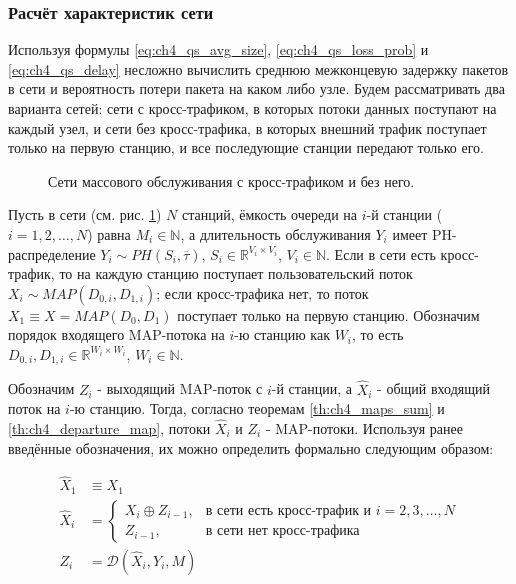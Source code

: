 \subsubsection{Расчёт характеристик сети}\label{sec:ch4_iterative_procedure}

Используя формулы \eqref{eq:ch4_qs_avg_size}, \eqref{eq:ch4_qs_loss_prob} и \eqref{eq:ch4_qs_delay} несложно вычислить среднюю межконцевую задержку пакетов в сети и вероятность потери пакета на каком либо узле. Будем рассматривать два варианта сетей: сети с кросс-трафиком, в которых потоки данных поступают на каждый узел, и сети без кросс-трафика, в которых внешний трафик поступает только на первую станцию, и все последующие станции передают только его.

\begin{figure}[htb]
  \caption{Сети массового обслуживания с кросс-трафиком и без него.}
  \label{fig:ch4_queueing_networks}
\end{figure}

Пусть в сети (см. рис. \ref{fig:ch4_queueing_networks}) $N$ станций, ёмкость очереди на $i$-й станции ($i = 1,2, \dots, N$) равна $M_i \in \mathbb{N}$, а длительность обслуживания $Y_i$ имеет PH-распределение $Y_i \sim PH(S_i, \overline{\tau})$, $S_i \in \mathbb{R}^{V_i \times V_i}$, $V_i \in \mathbb{N}$. Если в сети есть кросс-трафик, то на каждую станцию поступает пользовательский поток $X_i \sim MAP(D_{0,i}, D_{1,i})$; если кросс-трафика нет, то поток $X_1 \equiv X = MAP(D_0, D_1)$ поступает только на первую станцию. Обозначим порядок входящего MAP-потока на $i$-ю станцию как $W_i$, то есть $D_{0,i}, D_{1,i} \in \mathbb{R}^{W_i \times W_i}$, $W_i \in \mathbb{N}$.

Обозначим $Z_i$ - выходящий MAP-поток с $i$-й станции, а $\hat{X}_i$ - общий входящий поток на $i$-ю станцию. Тогда, согласно теоремам \ref{th:ch4_maps_sum} и \ref{th:ch4_departure_map}, потоки $\hat{X}_i$ и $Z_i$ - MAP-потоки. Используя ранее введённые обозначения, их можно определить формально следующим образом:

\begin{equation}
  \label{eq:ch4_total_arrival_and_departure}
  \begin{aligned}
    \hat{X}_1 &\equiv X_1\\
    \hat{X}_i &= \begin{cases}
      X_i \oplus Z_{i-1},&\text{в сети есть кросс-трафик и } i = 2,3, \dots, N\\
      Z_{i-1},&\text{в сети нет кросс-трафика}
    \end{cases}\\
    Z_i &= \mathcal{D}(\hat{X}_i, Y_i, M)
  \end{aligned}
\end{equation}

